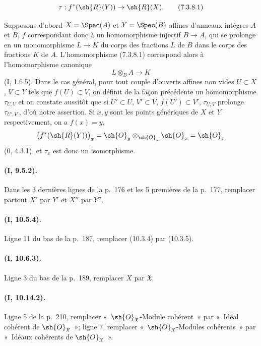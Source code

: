 \begin{equation}
\label{ega2:addendum:I.7.3.8.1-fr}
  \tau:f^*(\sh{R}(Y))\to\sh{R}(X).
\tag{7.3.8.1}
\end{equation}

Supposons d'abord $X=\Spec(A)$ et $Y=\Spec(B)$ affines d'anneaux
intègres $A$ et $B$, $f$ correspondant donc à un homomorphisme injectif
$B\to A$, qui se prolonge en un monomorphisme $L\to K$ du corps des
fractions $L$ de $B$ dans le corps des fractions $K$ de $A$.
L'homomorphisme (7.3.8.1) correspond alors à l'homomorphisme canonique
\[
  L\otimes_B A\to K
\]
(I, 1.6.5). Dans le cas général, pour tout couple d'ouverts affines non
vides $U\subset X$, $V\subset Y$ tels que $f(U)\subset V$, on définit
de la façon précédente un homomorphisme $\tau_{U,V}$ et on constate
aussitôt que si $U'\subset U$, $V'\subset V$,
$f(U')\subset V'$, $\tau_{U,V}$ prolonge $\tau_{U',V'}$, d'où notre
assertion. Si $x,y$ sont les points génériques de $X$ et $Y$
respectivement, on a $f(x)=y$,
\[
  \bigl(f^*(\sh{R}(Y))\bigr)_x
  =\sh{O}_y\otimes_{\sh{O}_y}\sh{O}_x
  =\sh{O}_x
\]
(0, 4.3.1), et $\tau_x$ est donc un isomorphisme.

\paragraph{(I, 9.5.2).}
Dans les 3 dernières lignes de la p.~176 et les 5 premières de la
p.~177, remplacer partout $X'$ par $Y'$ et $X''$ par $Y''$.

\paragraph{(I, 10.5.4).}
Ligne 11 du bas de la p.~187, remplacer (10.3.4) par (10.3.5).

\paragraph{(I, 10.6.3).}
Ligne 3 du bas de la p.~189, remplacer $X$ par $\mathfrak X$.

\paragraph{(I, 10.14.2).}
Ligne 5 de la p.~210, remplacer «~$\sh{O}_{\mathfrak X}$-Module cohérent~» par
«~Idéal cohérent de $\sh{O}_{\mathfrak X}$~»; ligne 7, remplacer
«~$\sh{O}_{\mathfrak X}$-Modules cohérents~» par «~Idéaux cohérents de
$\sh{O}_{\mathfrak X}$~».
